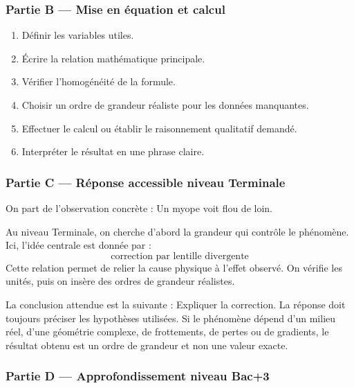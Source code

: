\documentclass[11pt,a4paper]{article}
\begin{document}
\subsubsection*{Partie B — Mise en équation et calcul}

\begin{enumerate}
  \item Définir les variables utiles.
  \item Écrire la relation mathématique principale.
  \item Vérifier l'homogénéité de la formule.
  \item Choisir un ordre de grandeur réaliste pour les données manquantes.
  \item Effectuer le calcul ou établir le raisonnement qualitatif demandé.
  \item Interpréter le résultat en une phrase claire.
\end{enumerate}

\subsubsection*{Partie C — Réponse accessible niveau Terminale}

\begin{corrigebox}
On part de l'observation concrète : Un myope voit flou de loin.

Au niveau Terminale, on cherche d'abord la grandeur qui contrôle le phénomène. Ici, l'idée centrale est donnée par :
\[
\text{correction par lentille divergente}
\]
Cette relation permet de relier la cause physique à l'effet observé. On vérifie les unités, puis on insère des ordres de grandeur réalistes.

La conclusion attendue est la suivante : Expliquer la correction. La réponse doit toujours préciser les hypothèses utilisées. Si le phénomène dépend d'un milieu réel, d'une géométrie complexe, de frottements, de pertes ou de gradients, le résultat obtenu est un ordre de grandeur et non une valeur exacte.
\end{corrigebox}

\subsubsection*{Partie D — Approfondissement niveau Bac+3}
\end{document}
